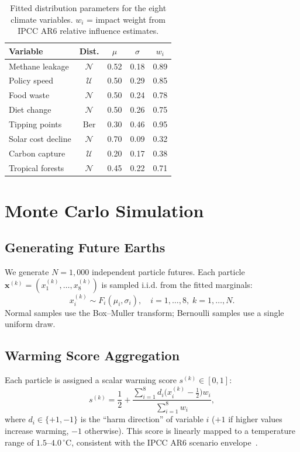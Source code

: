 \documentclass[10pt,twocolumn]{article}
\begin{document}
\begin{table}[t]
\centering
\caption{Fitted distribution parameters for the eight climate variables.
$w_i$ = impact weight from IPCC AR6 relative influence estimates.}
\label{tab:params}
\small
\begin{tabular}{lcccc}
\toprule
Variable & Dist. & $\mu$ & $\sigma$ & $w_i$ \\
\midrule
Methane leakage     & $\mathcal{N}$ & 0.52 & 0.18 & 0.89 \\
Policy speed        & $\mathcal{U}$ & 0.50 & 0.29 & 0.85 \\
Food waste          & $\mathcal{N}$ & 0.50 & 0.24 & 0.78 \\
Diet change         & $\mathcal{N}$ & 0.50 & 0.26 & 0.75 \\
Tipping points      & $\text{Ber}$  & 0.30 & 0.46 & 0.95 \\
Solar cost decline  & $\mathcal{N}$ & 0.70 & 0.09 & 0.32 \\
Carbon capture      & $\mathcal{U}$ & 0.20 & 0.17 & 0.38 \\
Tropical forests    & $\mathcal{N}$ & 0.45 & 0.22 & 0.71 \\
\bottomrule
\end{tabular}
\end{table}

\section{Monte Carlo Simulation}

\subsection{Generating Future Earths}

We generate $N=1{,}000$ independent particle futures.  Each particle
$\mathbf{x}^{(k)} = (x_1^{(k)},\ldots,x_8^{(k)})$ is sampled i.i.d.
from the fitted marginals:
\[
  x_i^{(k)} \sim F_i(\mu_i, \sigma_i), \quad i=1,\ldots,8,\; k=1,\ldots,N.
\]
Normal samples use the Box--Muller transform; Bernoulli samples use
a single uniform draw.

\subsection{Warming Score Aggregation}

Each particle is assigned a scalar warming score $s^{(k)} \in [0,1]$:
\[
  s^{(k)} = \frac{1}{2} + \frac{\sum_{i=1}^{8} d_i \bigl(x_i^{(k)}-\tfrac{1}{2}\bigr) w_i}{\sum_{i=1}^{8} w_i},
\]
where $d_i \in \{+1,-1\}$ is the ``harm direction'' of variable $i$
($+1$ if higher values increase warming, $-1$ otherwise).  This score
is linearly mapped to a temperature range of $1.5$--$4.0\,^\circ$C,
consistent with the IPCC AR6 scenario envelope~\cite{ipcc_ar6}.
\end{document}
